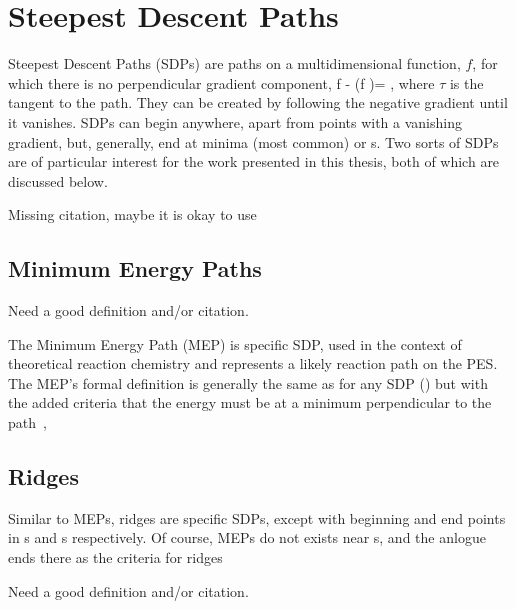 \section{Steepest Descent Paths}
\label{sec:sdps}


Steepest Descent Paths (SDPs) are paths on a multidimensional function, $f$, for which there is no perpendicular gradient component,
\nabla f - (\nabla f \cdot \tau)\tau = , 
\eeq
where $\tau$ is the tangent to the path.
They can be created by following the negative gradient until it vanishes.
SDPs can begin anywhere, apart from points with a vanishing gradient, but, generally, end at minima (most common) or \sap{}s.
Two sorts of SDPs are of particular interest for the work presented in this thesis, both of which are discussed below.

\bit
\item Missing citation, maybe it is okay to use \cite{gradient-extremals-ruedenberg-1993}
\eit

\subsection{Minimum Energy Paths}
\label{sec:meps}

\bit
\item Need a good definition and/or citation.
\eit

The Minimum Energy Path (MEP) is specific SDP, used in the context of theoretical reaction chemistry and represents a likely reaction path on the PES.
The MEP's formal definition is generally the same as for any SDP () but with the added criteria that the energy must be at a minimum perpendicular to the path~\cite{neb-polemic-henkelman1},
\text{\expand}
\eeq

\subsection{Ridges}
\label{sec:ridges}

Similar to MEPs, ridges are specific SDPs, except with beginning and end points in s and s respectively.
Of course, MEPs do not exists near s, and the anlogue ends there as the criteria for ridges \expand

\bit
\item Need a good definition and/or citation.
\eit

